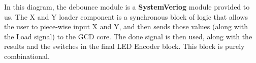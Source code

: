 \documentclass[a4paper, 12pt]{article}
\begin{document}
In this diagram, the debounce module is a \textbf{SystemVeriog} module provided to us. The X and Y loader component is a synchronous block of logic that allows the user to piece-wise input X and Y, and then sends those values (along with the Load signal) to the GCD core. The done signal is then used, along with the results and the switches in the final LED Encoder block. This block is purely combinational. 
\end{document}
